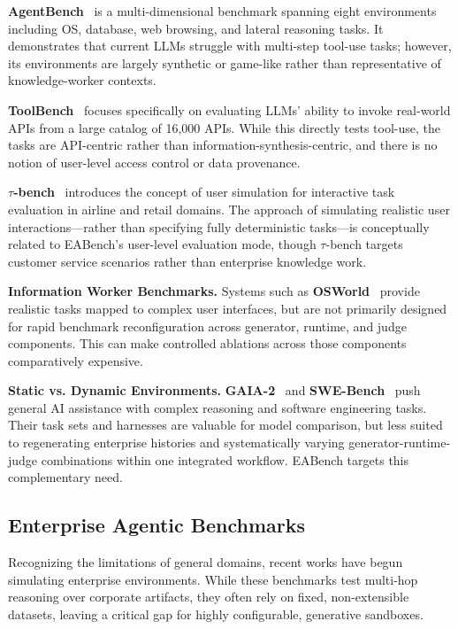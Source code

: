 \documentclass[journal,dvipsnames]{acmart}
\begin{document}
\textbf{AgentBench}~\cite{liu2023agentbench} is a multi-dimensional benchmark
spanning eight environments including OS, database, web browsing, and lateral
reasoning tasks.  It demonstrates that current LLMs struggle with multi-step
tool-use tasks; however, its environments are largely synthetic or game-like
rather than representative of knowledge-worker contexts.

\textbf{ToolBench}~\cite{qin2023toolllm} focuses specifically on evaluating
LLMs' ability to invoke real-world APIs from a large catalog of 16,000 APIs.
While this directly tests tool-use, the tasks are API-centric rather than
information-synthesis-centric, and there is no notion of user-level access
control or data provenance.

\textbf{$\tau$-bench}~\cite{yao2024taubench} introduces the concept of user
simulation for interactive task evaluation in airline and retail domains.  The
approach of simulating realistic user interactions---rather than specifying
fully deterministic tasks---is conceptually related to EABench's user-level
evaluation mode, though $\tau$-bench targets customer service scenarios rather
than enterprise knowledge work.

\textbf{Information Worker Benchmarks.} Systems such as \textbf{OSWorld}~\cite{xie2024osworld} provide realistic tasks mapped to complex user interfaces, but are not primarily designed for rapid benchmark reconfiguration across generator, runtime, and judge components. This can make controlled ablations across those components comparatively expensive.

\textbf{Static vs. Dynamic Environments.} \textbf{GAIA-2}~\cite{gaia2} and \textbf{SWE-Bench}~\cite{jimenez2024swebench} push general AI assistance with complex reasoning and software engineering tasks. Their task sets and harnesses are valuable for model comparison, but less suited to regenerating enterprise histories and systematically varying generator-runtime-judge combinations within one integrated workflow. EABench targets this complementary need.

  \subsection{Enterprise Agentic Benchmarks}
  
Recognizing the limitations of general domains, recent works have begun simulating enterprise environments. While these benchmarks test multi-hop reasoning over corporate artifacts, they often rely on fixed, non-extensible datasets, leaving a critical gap for highly configurable, generative sandboxes.
    
\end{document}
